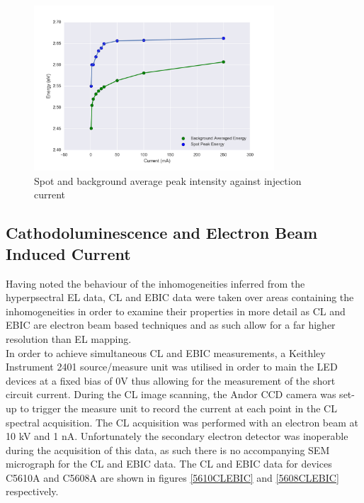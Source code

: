 \begin{figure}[!ht]
	\centering
	\includegraphics[width=0.8\textwidth]{Figs/Ch3/centrePeakcomp5608.png}
	\caption[h] {Spot and background average peak intensity against injection current}
	\label{5608centre}
\end{figure}
\FloatBarrier 

\subsection{Cathodoluminescence and Electron Beam Induced Current}
Having noted the behaviour of the inhomogeneities inferred from the hyperpsectral EL data, CL and EBIC data were taken over areas containing the inhomogeneities in order to examine their properties in more detail as CL and EBIC are electron beam based techniques and as such allow for a far higher resolution than EL mapping.\\
In order to achieve simultaneous CL and EBIC measurements, a Keithley Instrument 2401 source/measure unit was utilised in order to main the LED devices at a fixed bias of 0V thus allowing for the measurement of the short circuit current. During the CL image scanning, the Andor CCD camera was set-up to trigger the measure unit to record the current at each point in the CL spectral acquisition. The CL acquisition was performed with an electron beam at 10 kV and 1 nA. Unfortunately the secondary electron detector was inoperable during the acquisition of this data, as such there is no accompanying SEM micrograph for the CL and EBIC data. The CL and EBIC data for devices C5610A and C5608A are shown in figures \ref{5610CLEBIC} and \ref{5608CLEBIC} respectively.


